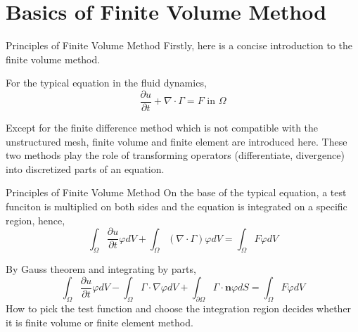 

\section{Basics of Finite Volume Method}

\begin{frame}{Principles of Finite Volume Method}
Firstly, here is a concise introduction to the finite volume method. 

For the typical equation in the fluid dynamics,
\begin{equation}
\frac{\partial u}{\partial t}+\nabla \cdot \Gamma=F \text { in } \Omega
\end{equation}

Except for the finite difference method which is not compatible with the unstructured mesh, finite volume and finite element are introduced here. These two methods play the role of transforming operators (differentiate, divergence) into discretized parts of an equation. 



\end{frame}

\begin{frame}{Principles of Finite Volume Method}
On the base of the typical equation, a test funciton is multiplied on both sides and the equation is integrated on a specific region, hence,
\begin{equation}
\int_{\Omega} \frac{\partial u}{\partial t} \varphi d V+\int_{\Omega}(\nabla \cdot \Gamma) \varphi d V=\int_{\Omega} F \varphi d V
\end{equation}

By Gauss theorem and integrating by parts, 
\begin{equation}
\int_{\Omega} \frac{\partial u}{\partial t} \varphi d V-\int_{\Omega} \Gamma \cdot \nabla \varphi d V+\int_{\partial \Omega} \Gamma \cdot \mathbf{n} \varphi d S=\int_{\Omega} F \varphi d V
\end{equation}
How to pick the test function and choose the integration region decides whether it is finite volume or finite element method.


\end{frame}


